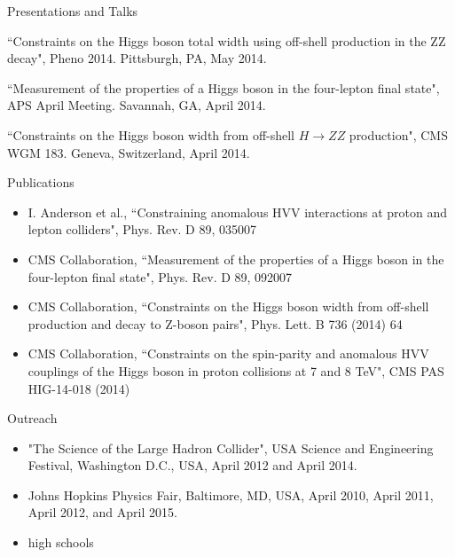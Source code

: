 \begin{small}
\begin{cvlist}{Presentations and Talks}
	\item
	``Constraints on the Higgs boson total width using off-shell production in the ZZ decay", Pheno 2014. Pittsburgh, PA, May 2014.
	\item
	``Measurement of the properties of a Higgs boson in the four-lepton final state", APS April Meeting. Savannah, GA, April 2014.
	\item
	``Constraints on the Higgs boson width from off-shell $H\rightarrow ZZ$ production", CMS WGM 183. Geneva, Switzerland, April 2014.
\end{cvlist}

\begin{cvlist}{Publications}
\item
\begin{itemize}\itemsep=0.25em
	\item
	I. Anderson et al., ``Constraining anomalous HVV interactions at proton and lepton colliders", Phys. Rev. D 89, 035007 
	\item
	CMS Collaboration, ``Measurement of the properties of a Higgs boson in the four-lepton final state", Phys. Rev. D 89, 092007
	\item 
	CMS Collaboration, ``Constraints on the Higgs boson width from off-shell production and decay to Z-boson pairs", Phys. Lett. B 736 (2014) 64 
	\item
	CMS Collaboration, ``Constraints on the spin-parity and anomalous HVV couplings of the Higgs boson in proton collisions at 7 and 8 TeV", CMS PAS HIG-14-018 (2014)
	\end{itemize}
\end{cvlist}

\begin{cvlist}{Outreach}
\item
\begin{itemize}\itemsep=0.25em
\item "The Science of the Large Hadron Collider", USA Science and Engineering Festival, Washington D.C., USA, April 2012 and  April 2014.
\item Johns Hopkins Physics Fair, Baltimore, MD, USA, April 2010, April 2011, April 2012, and April 2015.
\item high schools
\end{itemize}
\end{cvlist}

\setlength{\cvlabelwidth}{\oldcvlabelwidth}
\setlength{\cvlabelsep}{\oldcvlabelsep}
\end{small}
